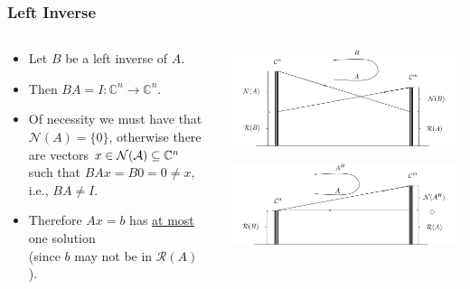 \documentclass{beamer}
\begin{document}
\begin{frame}\frametitle{Left Inverse}
	\begin{columns}
		\begin{column}{0.6\textwidth}
			\begin{itemize}
			\item 	Let $B$ be a left inverse of $A$.  
			\item Then $BA=I:\mathbb{C}^n\to\mathbb{C}^n$.  
			\item Of necessity we must have that $\mathcal{N}(A) = \{0\}$, otherwise there are vectors $x\in\mathcal{N}(\mathcal{A})\subseteq \mathbb{C}^n$ such that $BAx = B0 = 0 \neq x$, i.e., $BA\neq I$.
			\item Therefore $Ax = b$ has \underline{at most} one solution \\(since $b$ may not be in $\mathcal{R}(A)$).
			\end{itemize}
		\end{column}
		\begin{column}{0.5\textwidth}
			\begin{center}
	  			\includegraphics[width=\textwidth]{figures/chap4_left_inverse}	
			\end{center}
			\begin{center}	
	  			\includegraphics[width=\textwidth]{figures/chap4_left_inverse_full_rank}
			\end{center}
		\end{column}
	\end{columns}
\end{frame}
\end{document}
